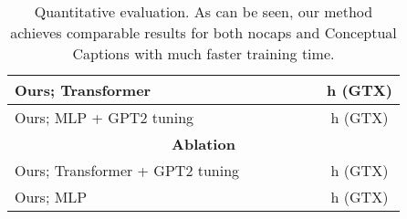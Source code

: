 \begin{table*}
\begin{center}
\begin{tabular}{p{}cccccc}
\toprule
Ours; Transformer   &  &  &   &  &  & \textbf{h} (GTX)\\
\midrule

Ours; MLP + GPT2 tuning &  &  &   &  &  & h (GTX)\\

\midrule

\multicolumn{7}{c}{ \textbf{Ablation}} \\
\bottomrule
\midrule

Ours; Transformer + GPT2 tuning  &  &  &   &  &  & h (GTX) \\

\midrule
Ours; MLP &  &  &  &  &  & h (GTX)\\
\midrule

\end{tabular}


\end{center}
\vspace{-0.1cm}
\caption{Quantitative evaluation. As can be seen, our method achieves comparable results for both nocaps and Conceptual Captions with much faster training time. }
\label{tab:num} 
\end{table*} 
























